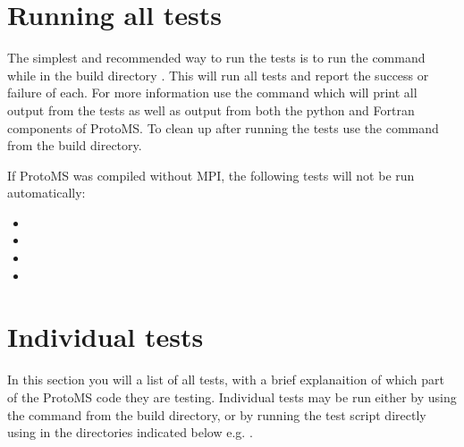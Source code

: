 \documentclass[letterpaper,10pt,english]{sphinxmanual}
\begin{document}
\section{Running all tests}
\label{testsuite:running-all-tests}
The simplest and recommended way to run the tests is to run the command  while in the build directory .  This will run all tests and report the success or failure of each.  For more information use the command  which will print all output from the tests as well as output from both the python and Fortran components of ProtoMS.  To clean up after running the tests use the command  from the build directory.

If ProtoMS was compiled without MPI, the following tests will not be run automatically:
\begin{itemize}
\item {} 

\item {} 

\item {} 

\item {} 

\end{itemize}


\section{Individual tests}
\label{testsuite:individual-tests}
In this section you will a list of all tests, with a brief explanaition of which part of the ProtoMS code they are testing.  Individual tests may be run either by using the command  from the build directory, or by running the test script directly using  in the directories indicated below e.g. .
\end{document}
